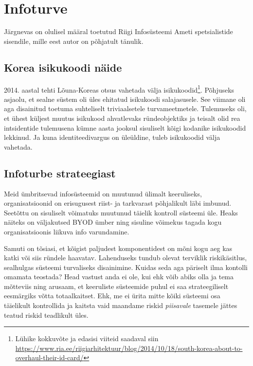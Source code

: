 \documentclass{tufte-book}
\begin{document}
\chapter{Infoturve}
Järgnevas on olulisel määral toetutud Riigi Infosüsteemi Ameti spetsialistide sisendile, mille eest autor on põhjatult tänulik.

\section{Korea isikukoodi näide}
2014. aastal tehti Lõuna-Koreas otsus vahetada välja isikukoodid\footnote{Lühike kokkuvõte ja edasisi viiteid saadaval siin \url{https://www.ria.ee/riigiarhitektuur/blog/2014/10/18/south-korea-about-to-overhaul-their-id-card/}}. Põhjuseks asjaolu, et sealne süstem oli üles ehitatud isikukoodi salajasusele. See viimane oli aga disainitud toetuma suhteliselt triviaalsetele turvameetmetele. Tulemuseks oli, et ühest küljest muutus isikukood ahvatlevaks ründeobjektiks ja teisalt olid rea intsidentide tulemusena kümne aasta jooksul sisuliselt kõigi kodanike isikukoodid lekkinud. Ja kuna identiteedivargus on üleüldine, tuleb isikukoodid välja vahetada.

\section{Infoturbe strateegiast}
Meid ümbritsevad infosüsteemid on muutunud ülimalt keeruliseks, organisatsioonid on erisugusest riist- ja tarkvarast põhjalikult läbi imbunud. Seetõttu on sisuliselt võimatuks muutunud täielik kontroll süsteemi üle. Heaks näiteks on väljakutsed BYOD ümber ning sisuline võimekus tagada kogu organisatsioonis liikuva info varundamine. 

Samuti on tõsiasi, et kõigist paljudest komponentidest on mõni kogu aeg kas katki või siis ründele haavatav. Lahenduseks tundub olevat terviklik riskikäsitlus, sealhulgas süsteemi turvaliseks disainimine. Kuidas seda aga päriselt ilma kontolli omamata teostada? Head vastust anda ei ole, kui ehk võib abiks olla \citeauthor{leveson2011engineering}\cite{leveson2011engineering} ja tema mõtteviis ning arusaam, et keeruliste süsteemide puhul ei saa strateegiliselt eesmärgiks võtta totaalkaitset. Ehk, me ei ürita mitte kõiki süsteemi osa täielikult kontrollida ja kaitsta vaid maandame riskid \emph{piisavale} tasemele jättes teatud riskid teadlikult üles. 
\end{document}
